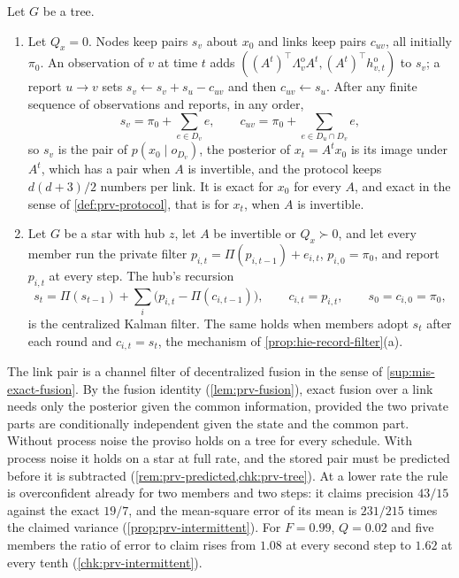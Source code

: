 \begin{theorem}\label{thm:prv-tree}
Let $G$ be a tree.
\begin{enumerate}
\item[(a)] Let $Q_x=0$. Nodes keep pairs $s_v$ about $x_0$ and links keep pairs $c_{uv}$, all initially $\pi_0$. An observation of $v$ at time $t$ adds $((A^t)^\top\Lambda^{\mathrm o}_vA^t,(A^t)^\top h^{\mathrm o}_{v,t})$ to $s_v$; a report $u\to v$ sets $s_v\leftarrow s_v+s_u-c_{uv}$ and then $c_{uv}\leftarrow s_u$. After any finite sequence of observations and reports, in any order,
\[
s_v=\pi_0+\sum_{e\in D_v}e,\qquad c_{uv}=\pi_0+\sum_{e\in D_u\cap D_v}e,
\]
so $s_v$ is the pair of $p(x_0\mid o_{D_v})$, the posterior of $x_t=A^tx_0$ is its image under $A^t$, which has a pair when $A$ is invertible, and the protocol keeps $d(d+3)/2$ numbers per link. It is exact for $x_0$ for every $A$, and exact in the sense of \cref{def:prv-protocol}, that is for $x_t$, when $A$ is invertible.
\item[(b)] Let $G$ be a star with hub $z$, let $A$ be invertible or $Q_x\succ0$, and let every member run the private filter $p_{i,t}=\Pi(p_{i,t-1})+e_{i,t}$, $p_{i,0}=\pi_0$, and report $p_{i,t}$ at every step. The hub's recursion
\[
s_t=\Pi(s_{t-1})+\sum_i\bigl(p_{i,t}-\Pi(c_{i,t-1})\bigr),\qquad c_{i,t}=p_{i,t},\qquad s_0=c_{i,0}=\pi_0,
\]
is the centralized Kalman filter. The same holds when members adopt $s_t$ after each round and $c_{i,t}=s_t$, the mechanism of \cref{prop:hie-record-filter}(a).
\end{enumerate}
\end{theorem}

The link pair is a channel filter of decentralized fusion in the sense of \cref{sup:mis-exact-fusion}. By the fusion identity (\cref{lem:prv-fusion}), exact fusion over a link needs only the posterior given the common information, provided the two private parts are conditionally independent given the state and the common part. Without process noise the proviso holds on a tree for every schedule. With process noise it holds on a star at full rate, and the stored pair must be predicted before it is subtracted (\cref{rem:prv-predicted,chk:prv-tree}). At a lower rate the rule is overconfident already for two members and two steps: it claims precision $43/15$ against the exact $19/7$, and the mean-square error of its mean is $231/215$ times the claimed variance (\cref{prop:prv-intermittent}). For $F=0.99$, $Q=0.02$ and five members the ratio of error to claim rises from $1.08$ at every second step to $1.62$ at every tenth (\cref{chk:prv-intermittent}).

